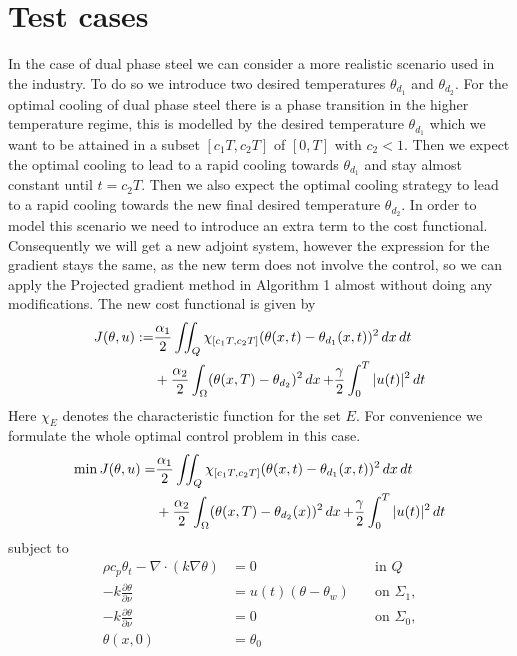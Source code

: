 \section{Test cases}

In the case of dual phase steel we can consider a more realistic scenario used in the industry. To do so we introduce two desired temperatures $\theta_{d_1}$ and $\theta_{d_2}$. For the optimal cooling of dual phase steel there is a phase transition in the higher temperature regime, this is modelled by the desired temperature $\theta_{d_1}$ which we want to be attained in a subset $[c_1T, c_2T]$ of $[0,T]$ with $c_2 <1$. Then we expect the optimal cooling to lead to a rapid cooling towards $\theta_{d_1}$ and stay almost constant until $t=c_2T$. Then we also expect the optimal cooling strategy to lead to a rapid cooling towards the new final desired temperature $\theta_{d_2}$. In order to model this scenario we need to introduce an extra term to the cost functional. Consequently we will get a new adjoint system, however the expression for the gradient stays the same, as the new term does not involve the control, so we can apply the Projected gradient method in Algorithm 1 almost without doing any modifications. The new cost functional is given by 
\begin{equation}
\begin{aligned}
    \label{eq:new_cost}
    J(\theta,u) : =& \frac{\alpha_1}{2}\iint_{Q}\chi_{[c_1T,c_2T]}(\theta(x,t) - \theta_{d_1}(x,t))^2 \mathop{dx}\mathop{dt} \\
    &+ \frac{\alpha_2}{2}\int_{\Omega} (\theta(x,T) - \theta_{d_2})^2 \mathop{dx} + \frac{\gamma}{2}\int_0^T|u(t)|^2\mathop{dt}
\end{aligned}
\end{equation}
Here $\chi_E$ denotes the characteristic function for the set $E$. For convenience we formulate the whole optimal control problem in this case. 
\begin{equation*}
\begin{aligned}
   \min J(\theta, u) =& \frac{\alpha_1}{2}\iint_{Q}\chi_{[c_1T,c_2T]}(\theta(x,t) - \theta_{d_1}(x,t))^2 \mathop{dx}\mathop{dt} \\
   &+ \frac{\alpha_2}{2} \int_\Omega (\theta(x, T) - \theta_{d_2}(x))^2 \mathop{dx} + \frac{\gamma}{2} \int_0^{T} |u(t)|^2 \mathop{dt} 
\end{aligned}
\end{equation*}
subject to
\begin{align*}
       \rho c_p \theta_t - \nabla \cdot (k \nabla \theta) &= 0 \quad &\text{in } Q  \\
      -k \frac{\partial \theta}{\partial \nu} &= u(t) (\theta - \theta_w) \quad &\text{on } \Sigma_1, \\
      -k \frac{\partial \theta}{\partial \nu} &= 0 \quad &\text{on } \Sigma_0, \\
      \theta(x, 0) &= \theta_0 &
\end{align*}

